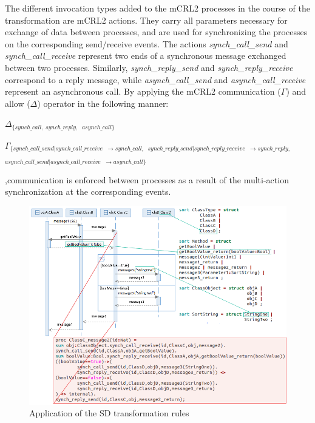 \documentclass[letter]{llncs}
\newcommand{\figshrink}{\vspace{-.6cm}}
\newcommand{\figshrinkend}{}
\begin{document}
The different invocation types added to the mCRL2 processes in the course of the transformation are mCRL2 actions.
They carry all parameters necessary for exchange of data between processes, and are used for synchronizing the processes
on the corresponding send/receive events. The actions \emph{synch\_call\_send} and \emph{synch\_call\_receive} represent
two ends of a synchronous message exchanged between two processes. Similarly, \emph{synch\_reply\_send} 
and \emph{synch\_reply\_receive} correspond to a reply message, while \emph{asynch\_call\_send} and \emph{asynch\_call\_receive} 
represent an asynchronous call. By applying the mCRL2 communication ($\Gamma$) and allow ($\Delta$) operator in the following manner:
 \vspace{-10 pt}
\begin{center}
$ \Delta_{\{synch\_call,\ synch\_reply, } $
  $    _{asynch\_call\}} $
  
$ \Gamma_{\{synch\_call\_send|
   synch\_call\_receive} $
  $  _{\rightarrow synch\_call, } $
  $ _{synch\_reply\_send|synch\_reply\_receive} $
  $  _{\rightarrow synch\_reply,} $
 $ _{asynch\_call\_send|asynch\_call\_receive} $
  $  _{\rightarrow asynch\_call\}} $
\end{center}
,communication is enforced between processes as a result of the multi-action synchronization at the corresponding events. 

\begin{figure}[t!]
\centering
\figshrink
\includegraphics[width=1.0\linewidth]{./Figure6_final.png}
\caption{Application of the SD transformation rules}
\label{fig:application1}
\figshrinkend
\end{figure}
\end{document}
